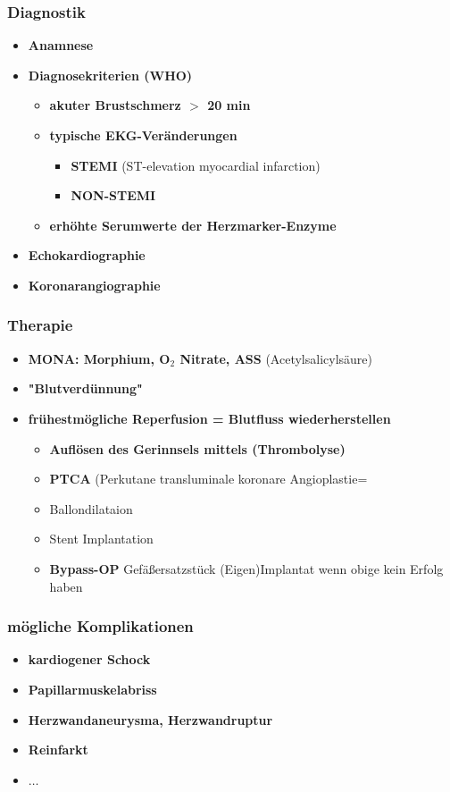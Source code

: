 	\subsubsection{Diagnostik}
		\begin{itemize}
			\item \textbf{Anamnese}
			\item \textbf{Diagnosekriterien (WHO)}
				\begin{itemize}
					\item \textbf{akuter Brustschmerz $>$ 20 min}
					\item \textbf{typische EKG-Veränderungen}
						\begin{itemize}
							\item \textbf{STEMI} (ST-elevation myocardial infarction)
							\item \textbf{NON-STEMI}
						\end{itemize}
					\item \textbf{erhöhte Serumwerte der Herzmarker-Enzyme}
				\end{itemize}
			\item \textbf{Echokardiographie}
			\item \textbf{Koronarangiographie}
		\end{itemize}
	\subsubsection{Therapie}
		\begin{itemize}
			\item \textbf{MONA: Morphium, O$_2$ Nitrate, ASS} (Acetylsalicylsäure)
			\item \textbf{"Blutverdünnung"}
			\item \textbf{frühestmögliche Reperfusion = Blutfluss wiederherstellen}
				\begin{itemize}
					\item \textbf{Auflösen des Gerinnsels mittels (Thrombolyse)}
					\item \textbf{PTCA} (Perkutane transluminale koronare Angioplastie=
					\item Ballondilataion
					\item Stent Implantation
					\item \textbf{Bypass-OP} Gefäßersatzstück (Eigen)Implantat wenn obige kein Erfolg haben
				\end{itemize}
		\end{itemize}
	\subsubsection{mögliche Komplikationen}
		\begin{itemize}
			\item \textbf{kardiogener Schock}
			\item \textbf{Papillarmuskelabriss}
			\item \textbf{Herzwandaneurysma, Herzwandruptur}
			\item \textbf{Reinfarkt}
			\item \textbf{$\dots$}
		\end{itemize}
